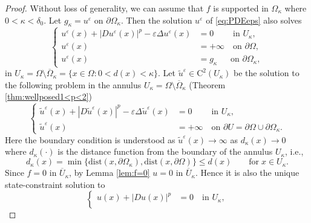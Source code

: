 \documentclass[11pt,reqno]{amsart}
\numberwithin{figure}{section}
\theoremstyle{plain}
\theoremstyle{remark}
\numberwithin{equation}{section}
\begin{document}
\begin{proof} Without loss of generality, we can assume that $f$ is supported in $\Omega_\kappa$ where $0<\kappa < \delta_{0}$.
Let $g_\kappa = u^\varepsilon$ on $\partial\Omega_{\kappa}$. Then the solution $u^\varepsilon$ of \eqref{eq:PDEeps} also solves
\begin{equation*}
    \left\{
  \begin{aligned}
  u^\varepsilon(x) + |Du^\varepsilon(x)|^p-\varepsilon \Delta u^\varepsilon(x) &=0 \;\qquad \text{in } U_\kappa ,\\
  u^\varepsilon(x) &= +\infty \quad \text{on } \partial \Omega,\\
  u^\varepsilon(x) &= g_\kappa \;\;\quad \text{on } \partial \Omega_{\kappa},
    \end{aligned}
\right.
\end{equation*}
in $U_\kappa= \Omega \setminus \overline{\Omega}_{\kappa} = \{x\in \Omega: 0< d(x) < \kappa\}$. Let $\tilde{u}^\varepsilon\in \mathrm{C}^2(U_\kappa)$ be the solution to the following problem in the annulus $U_\kappa= \Omega \setminus \overline{\Omega}_{\kappa}$ (Theorem \ref{thm:wellposed1<p<2})
\begin{equation*}
    \left\{
        \begin{aligned}
            \tilde{u}^\varepsilon(x) + |D\tilde{u}^\varepsilon(x)|^p-\varepsilon \Delta \tilde{u}^\varepsilon(x) &=0 \;\qquad \text{in } U_\kappa ,\\
            \tilde{u}^\varepsilon(x) &= +\infty \quad \text{on } \partial U = \partial \Omega\cup \partial \Omega_{\kappa}.
        \end{aligned}
    \right.
\end{equation*}
Here the boundary condition is understood as $\tilde{u}^\varepsilon(x)\to \infty$ as $d_\kappa(x)\to 0$ where $d_\kappa(\cdot)$ is the distance function from the boundary of the annulus $U_\kappa$, i.e.,
\begin{equation*}
    d_\kappa(x) = \min \big\lbrace \mathrm{dist}(x,\partial \Omega_\kappa),\mathrm{dist}(x,\partial\Omega)  \big\rbrace \leq d(x) \qquad\text{for}\;x\in U_\kappa.
\end{equation*}
Since $f = 0$ in $\overline{U}_\kappa$, by Lemma \ref{lem:f=0} $u=0$ in $\overline{U}_\kappa$. Hence it is also the unique state-constraint solution to
\begin{equation*}
    \left\{
        \begin{aligned}
            u(x)+ |Du(x)|^p &=0 \quad \text{in } U_\kappa ,\\

\end{aligned}
\end{equation*}
\end{proof}
\end{document}
